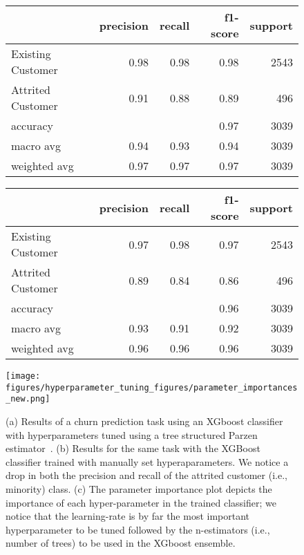 \begin{figure*}[!ht]
    \begin{minipage}{0.45\textwidth}
        \centering
        \begin{tabular}{lrrrr}
            \toprule
            {} &  precision &  recall &  f1-score &   support \\
            \midrule
            Existing Customer &0.98& 0.98& 0.98&2543\\
            Attrited Customer & 0.91& 0.88& 0.89&496\\
            accuracy          & & & 0.97&3039\\
            macro avg         & 0.94& 0.93& 0.94&3039\\
            weighted avg      & 0.97& 0.97& 0.97&3039\\
        \bottomrule
        \end{tabular}
        \label{tab:hyp_tuning}
    \end{minipage}
    \hfill
    \begin{minipage}{0.45\textwidth}
        \centering
        \begin{tabular}{lrrrr}
            \toprule
            {} &  precision &  recall &  f1-score &   support \\
            \midrule
            Existing Customer & 0.97& 0.98& 0.97&2543 \\
            Attrited Customer & 0.89& 0.84& 0.86&496 \\
            accuracy          & & & 0.96&3039 \\
            macro avg         & 0.93&0.91 & 0.92&3039 \\
            weighted avg      & 0.96& 0.96& 0.96&3039 \\
            \bottomrule
        \end{tabular}
    \label{tab:no_hyp_tuning}
    \end{minipage}
    \vfill
    \begin{minipage}{0.45\textwidth}
    \centering
    \texttt{[image: figures/hyperparameter\_tuning\_figures/parameter\_importances\_new.png]}
    \label{fig:hyp_param_importance}
    \end{minipage}
    \caption{(a) Results of a churn prediction task using an XGboost classifier with hyperparameters tuned using a tree structured Parzen estimator~\cite{bergstra2011algorithms,bergstra2013making}. (b) Results for the same task with the XGBoost classifier trained with manually set hyperaparameters. We notice a drop in both the precision and recall of the attrited customer (i.e., minority) class. (c) The parameter importance plot depicts the importance of each hyper-parameter in the trained classifier; we notice that the learning-rate is by far the most important hyperparameter to be tuned followed by the n-estimators (i.e., number of trees) to be used in the XGboost ensemble. }
    \label{fig:hyp_optimization_plots}
\end{figure*}
